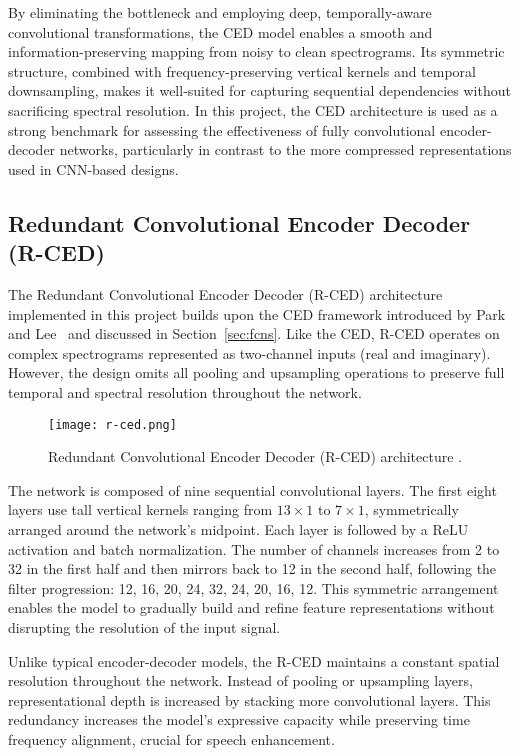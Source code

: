 By eliminating the bottleneck and employing deep, temporally-aware convolutional transformations, the CED model enables a smooth and information-preserving mapping from noisy to clean spectrograms. Its symmetric structure, combined with frequency-preserving vertical kernels and temporal downsampling, makes it well-suited for capturing sequential dependencies without sacrificing spectral resolution. In this project, the CED architecture is used as a strong benchmark for assessing the effectiveness of fully convolutional encoder-decoder networks, particularly in contrast to the more compressed representations used in CNN-based designs.

\subsection{Redundant Convolutional Encoder Decoder (R-CED)}
\label{sec:rced}

The Redundant Convolutional Encoder Decoder (R-CED) architecture implemented in this project builds upon the CED framework introduced by Park and Lee~\cite{park2017acoustic} and discussed in Section~\ref{sec:fcns}. Like the CED, R-CED operates on complex spectrograms represented as two-channel inputs (real and imaginary). However, the design omits all pooling and upsampling operations to preserve full temporal and spectral resolution throughout the network.

\begin{figure}[h]
    \centering
    \texttt{[image: r-ced.png]}
    \caption{\label{fig:rced}Redundant Convolutional Encoder Decoder (R-CED) architecture \cite{park2017acoustic}.}
\end{figure}

The network is composed of nine sequential convolutional layers. The first eight layers use tall vertical kernels ranging from \(13 \times 1\) to \(7 \times 1\), symmetrically arranged around the network's midpoint. Each layer is followed by a ReLU activation and batch normalization. The number of channels increases from 2 to 32 in the first half and then mirrors back to 12 in the second half, following the filter progression: 12, 16, 20, 24, 32, 24, 20, 16, 12. This symmetric arrangement enables the model to gradually build and refine feature representations without disrupting the resolution of the input signal.

Unlike typical encoder-decoder models, the R-CED maintains a constant spatial resolution throughout the network. Instead of pooling or upsampling layers, representational depth is increased by stacking more convolutional layers. This redundancy increases the model’s expressive capacity while preserving time frequency alignment, crucial for speech enhancement.

